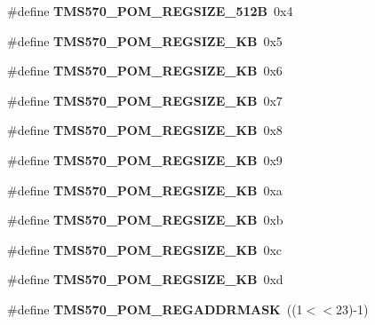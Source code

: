 \begin{DoxyCompactItemize}
\#define {\bfseries T\+M\+S570\+\_\+\+P\+O\+M\+\_\+\+R\+E\+G\+S\+I\+Z\+E\+\_\+512B}~0x4
\item 
\mbox{\label{tms570-pom_8h_a98d9101102deec9572fa23ef6e232c9e}} 
\#define {\bfseries T\+M\+S570\+\_\+\+P\+O\+M\+\_\+\+R\+E\+G\+S\+I\+Z\+E\+\_\+KB}~0x5
\item 
\mbox{\label{tms570-pom_8h_a837269cd179f0a20fc483ea1bf432907}} 
\#define {\bfseries T\+M\+S570\+\_\+\+P\+O\+M\+\_\+\+R\+E\+G\+S\+I\+Z\+E\+\_\+KB}~0x6
\item 
\mbox{\label{tms570-pom_8h_abadaf9fb6098928565be240cec7754eb}} 
\#define {\bfseries T\+M\+S570\+\_\+\+P\+O\+M\+\_\+\+R\+E\+G\+S\+I\+Z\+E\+\_\+KB}~0x7
\item 
\mbox{\label{tms570-pom_8h_ad609255e2c71fbffda626e60296f8ca1}} 
\#define {\bfseries T\+M\+S570\+\_\+\+P\+O\+M\+\_\+\+R\+E\+G\+S\+I\+Z\+E\+\_\+KB}~0x8
\item 
\mbox{\label{tms570-pom_8h_a5fb19eb81bf9520eda62f667d92831af}} 
\#define {\bfseries T\+M\+S570\+\_\+\+P\+O\+M\+\_\+\+R\+E\+G\+S\+I\+Z\+E\+\_\+KB}~0x9
\item 
\mbox{\label{tms570-pom_8h_a90cab10dbc30a38002335655a10e4e35}} 
\#define {\bfseries T\+M\+S570\+\_\+\+P\+O\+M\+\_\+\+R\+E\+G\+S\+I\+Z\+E\+\_\+KB}~0xa
\item 
\mbox{\label{tms570-pom_8h_a66687f12db4ad3d866e08edd87226bc5}} 
\#define {\bfseries T\+M\+S570\+\_\+\+P\+O\+M\+\_\+\+R\+E\+G\+S\+I\+Z\+E\+\_\+KB}~0xb
\item 
\mbox{\label{tms570-pom_8h_af8fc8a522d1e4c8c574dfd904f896088}} 
\#define {\bfseries T\+M\+S570\+\_\+\+P\+O\+M\+\_\+\+R\+E\+G\+S\+I\+Z\+E\+\_\+KB}~0xc
\item 
\mbox{\label{tms570-pom_8h_a14840b2ed5009c45c16b4c12f6db8916}} 
\#define {\bfseries T\+M\+S570\+\_\+\+P\+O\+M\+\_\+\+R\+E\+G\+S\+I\+Z\+E\+\_\+KB}~0xd
\item 
\mbox{\label{tms570-pom_8h_a7b682266a751ee04000cecf0c242c015}} 
\#define {\bfseries T\+M\+S570\+\_\+\+P\+O\+M\+\_\+\+R\+E\+G\+A\+D\+D\+R\+M\+A\+SK}~((1$<$$<$23)-\/1)
\end{DoxyCompactItemize}
